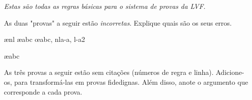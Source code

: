 \emph{Estas s\~ao todas as regras b\'asicas para o sistema de provas da LVF.}


\practiceproblems

\problempart
As duas "provas" a seguir est\~ao  \emph{incorretas}. Explique quais s\~ao os seus erros.
\begin{fitchproof}
\open
{}
\ae{nl}
	\ae{abc}
\close
\open
\close
{}\oe{abc, nla-a, l-a2}
\end{fitchproof}

\begin{fitchproof}
\ae{abc}
\end{fitchproof}

\problempart
As tr\^es provas a seguir est\~ao sem cita\c c\~oes (n\'umeros de regra e linha). Adicione-os, para transform\'a-las  em provas fidedignas.  Al\'em disso, anote o argumento que corresponde a cada prova.
\begin{multicols}{2}
\begin{fitchproof}
\end{fitchproof}

\begin{fitchproof}
\open
\close
{}%
\end{fitchproof}

\begin{fitchproof}
\open
\close
\open
\close
{}%
\end{fitchproof}
\end{multicols}

